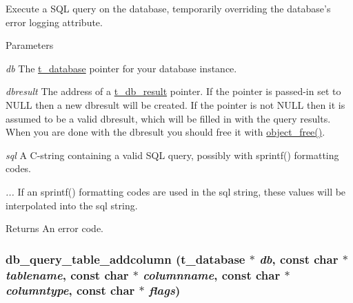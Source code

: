 Execute a SQL query on the database, temporarily overriding the database's error logging attribute. 
\begin{DoxyParams}{Parameters}
\item[{\em db}]The \hyperlink{group__database_gad832ea0e5fc292661fd20046cee7e3b3}{t\_\-database} pointer for your database instance. \item[{\em dbresult}]The address of a \hyperlink{group__database_gae34db00cb98960e94b5ca58a7c21c362}{t\_\-db\_\-result} pointer. If the pointer is passed-\/in set to NULL then a new dbresult will be created. If the pointer is not NULL then it is assumed to be a valid dbresult, which will be filled in with the query results. When you are done with the dbresult you should free it with \hyperlink{group__obj_ga3759846cb356195532c41e35b87522ee}{object\_\-free()}. \item[{\em sql}]A C-\/string containing a valid SQL query, possibly with sprintf() formatting codes. \item[{\em ...}]If an sprintf() formatting codes are used in the sql string, these values will be interpolated into the sql string. \end{DoxyParams}
\begin{DoxyReturn}{Returns}
An error code. 
\end{DoxyReturn}
\hypertarget{group__database_gaafcaffcf5fea4ded0d474e1332b8a922}{
\subsubsection[{db\_\-query\_\-table\_\-addcolumn}]{ db\_\-query\_\-table\_\-addcolumn ({\bf t\_\-database} $\ast$ {\em db}, \/  const char $\ast$ {\em tablename}, \/  const char $\ast$ {\em columnname}, \/  const char $\ast$ {\em columntype}, \/  const char $\ast$ {\em flags})}}
\label{group__database_gaafcaffcf5fea4ded0d474e1332b8a922}


